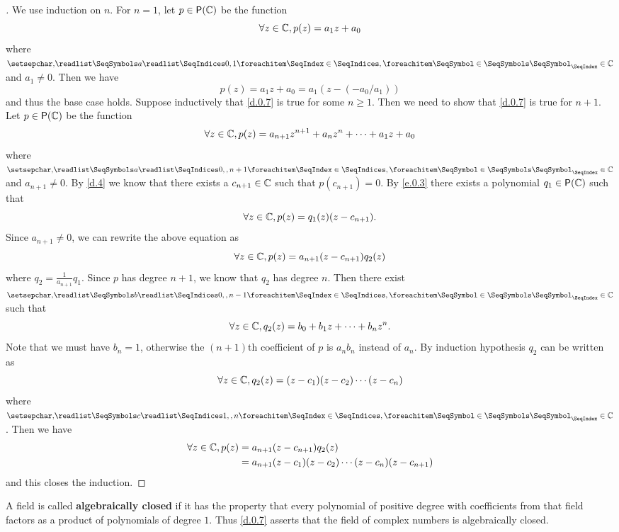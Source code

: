 \begin{proof}[]
	We use induction on \(n\).
	For \(n = 1\), let \(p \in \ps{\C}\) be the function
	\[
		\forall z \in \mathbb{C}, p(z) = a_1 z + a_0
	\]
	where \(\seq{a}{0,1} \in \C\) and \(a_1 \neq 0\).
	Then we have
	\[
		p(z) = a_1 z + a_0 = a_1 (z - (-a_0 / a_1))
	\]
	and thus the base case holds.
	Suppose inductively that \cref{d.0.7} is true for some \(n \geq 1\).
	Then we need to show that \cref{d.0.7} is true for \(n + 1\).
	Let \(p \in \ps{\C}\) be the function
	\[
		\forall z \in \mathbb{C}, p(z) = a_{n + 1} z^{n + 1} + a_n z^n + \cdots + a_1 z + a_0
	\]
	where \(\seq{a}{0,,n+1} \in \C\) and \(a_{n + 1} \neq 0\).
	By \cref{d.4} we know that there exists a \(c_{n + 1} \in \mathbb{C}\) such that \(p(c_{n + 1}) = 0\).
	By \cref{e.0.3} there exists a polynomial \(q_1 \in \ps{\C}\) such that
	\[
		\forall z \in \mathbb{C}, p(z) = q_1(z) (z - c_{n + 1}).
	\]
	Since \(a_{n + 1} \neq 0\), we can rewrite the above equation as
	\[
		\forall z \in \mathbb{C}, p(z) = a_{n + 1} (z - c_{n + 1}) q_2(z)
	\]
	where \(q_2 = \frac{1}{a_{n + 1}} q_1\).
	Since \(p\) has degree \(n + 1\), we know that \(q_2\) has degree \(n\).
	Then there exist \(\seq{b}{0,,n-1} \in \C\) such that
	\[
		\forall z \in \mathbb{C}, q_2(z) = b_0 + b_1 z + \cdots + b_n z^n.
	\]
	Note that we must have \(b_n = 1\), otherwise the \((n + 1)\)th coefficient of \(p\) is \(a_n b_n\) instead of \(a_n\).
	By induction hypothesis \(q_2\) can be written as
	\[
		\forall z \in \mathbb{C}, q_2(z) = (z - c_1) (z - c_2) \cdots (z - c_n)
	\]
	where \(\seq{c}{1,,n} \in \C\).
	Then we have
	\begin{align*}
		\forall z \in \mathbb{C}, p(z) & = a_{n + 1} (z - c_{n + 1}) q_2(z)                               \\
		                       & = a_{n + 1} (z - c_1) (z - c_2) \cdots (z - c_n) (z - c_{n + 1})
	\end{align*}
	and this closes the induction.
\end{proof}

\begin{defn}\label{d.0.8}
	A field is called \textbf{algebraically closed} if it has the property that every polynomial of positive degree with coefficients from that field factors as a product of polynomials of degree \(1\).
	Thus \cref{d.0.7} asserts that the field of complex numbers is algebraically closed.
\end{defn}
